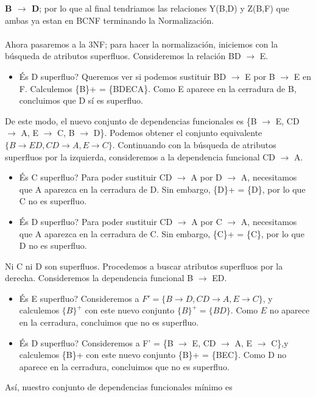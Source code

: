 \documentclass[a4paper, 12pt]{report}
\begin{document}
\begin{enumerate}
\begin{enumerate}
	\textbf{B $\rightarrow$ D};
	por lo que al final tendriamos las relaciones Y(B,D) y Z(B,F) que ambas ya estan en BCNF terminando la Normalización.
	\\\\
	Ahora pasaremos a la 3NF; para hacer la normalización, iniciemos con
  la búsqueda de atributos superfluos. Consideremos la relación
  BD $\rightarrow$ E.
  \begin{itemize}
    \item És D superfluo?  Queremos ver si podemos sustituir
      BD $\rightarrow$ E por B $\rightarrow$ E en F.   Calculemos \{B\}+ =
      \{BDECA\}. Como E aparece en la cerradura de B,
      concluimos que D sí es superfluo.
  \end{itemize}
  De este modo, el nuevo conjunto de dependencias funcionales
  es \{B $\rightarrow$ E, CD $\rightarrow$ A, E $\rightarrow$ C, B $\rightarrow$ D\}. Podemos obtener el conjunto equivalente
  $\{B \to ED, CD \to A, E \to C\}$.  Continuando con la búsqueda
  de atributos superfluos por la izquierda, consideremos a la
  dependencia funcional CD $\rightarrow$ A.
  \begin{itemize}
    \item És C superfluo? Para poder sustituir CD $\rightarrow$ A por
      D $\rightarrow$ A, necesitamos que A aparezca en la cerradura de
      D.   Sin embargo, \{D\}+ = \{D\}, por lo que C no
      es superfluo.

    \item És D superfluo? Para poder sustituir CD $\rightarrow$ A por
      C $\rightarrow$ A, necesitamos que A aparezca en la cerradura de
      C.   Sin embargo, \{C\}+ = \{C\}, por lo que D no
      es superfluo.
  \end{itemize}
  Ni C ni D son superfluos.   Procedemos a buscar atributos
  superfluos por la derecha.   Consideremos la dependencia funcional
  B $\rightarrow$ ED.
  \begin{itemize}
    \item És E superfluo?   Consideremos a $F' = \{ B \to D,
      CD \to A, E \to C\}$, y calculemos $\{B\}^+$ con este nuevo
      conjunto $\{B\}^+ = \{BD\}$.   Como $E$ no aparece en la
      cerradura, concluimos que no es superfluo.

    \item És D superfluo?   Consideremos a F' = \{B $\rightarrow$ E,
      CD $\rightarrow$ A, E $\rightarrow$ C\},y calculemos \{B\}+ con este nuevo
      conjunto \{B\}+ = \{BEC\}. Como D no aparece en la
      cerradura, concluimos que no es superfluo.
  \end{itemize}
  Así, nuestro conjunto de dependencias funcionales mínimo
  es 
  

\end{enumerate}
\end{enumerate}
\end{document}
